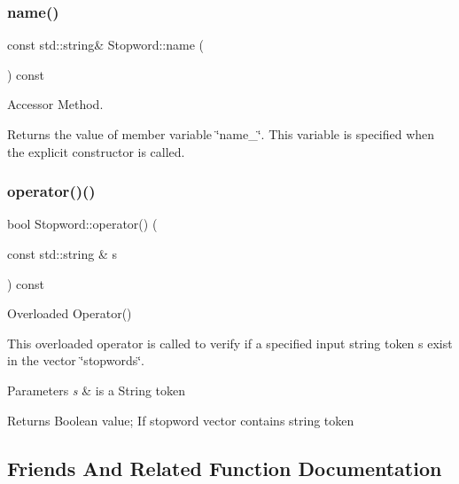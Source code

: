 \subsubsection{\texorpdfstring{name()}{name()}}
{\footnotesize\ttfamily const std\+::string\& Stopword\+::name (\begin{DoxyParamCaption}{ }\end{DoxyParamCaption}) const\hspace{0.3cm}{\ttfamily [inline]}}



Accessor Method. 

Returns the value of member variable \char`\"{}name\+\_\+\char`\"{}. This variable is specified when the explicit constructor is called. \mbox{\label{class_stopword_a0f16e88a567b2e69f67a6c14f47d8655}} 
\subsubsection{\texorpdfstring{operator()()}{operator()()}}
{\footnotesize\ttfamily bool Stopword\+::operator() (\begin{DoxyParamCaption}\item[{const std\+::string \&}]{s }\end{DoxyParamCaption}) const}



Overloaded Operator() 

This overloaded operator is called to verify if a specified input string token s exist in the vector \char`\"{}stopwords\char`\"{}.


\begin{DoxyParams}{Parameters}
{\em s} & is a String token \\
\hline
\end{DoxyParams}
\begin{DoxyReturn}{Returns}
Boolean value; If stopword vector contains string token 
\end{DoxyReturn}


\subsection{Friends And Related Function Documentation}
\mbox{\label{class_stopword_a743f7e7caa12801dd9cbf74e4eed8d63}} 
